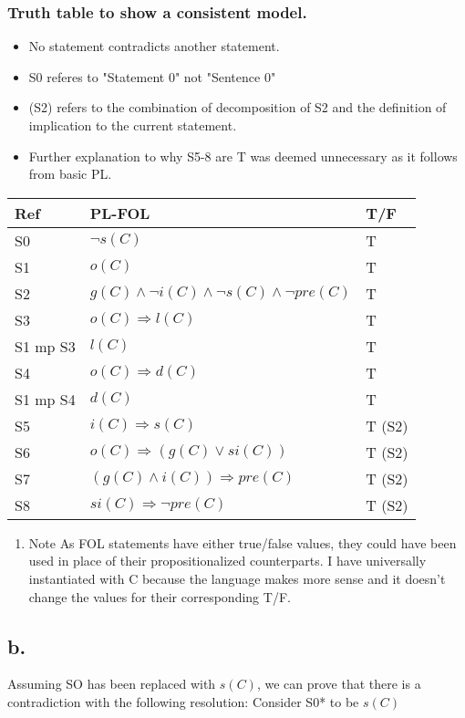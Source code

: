\documentclass[11pt]{article}
\begin{document}
\subsubsection{Truth table to show a consistent model.}
\label{sec:orgddc852a}
\begin{itemize}
\item No statement contradicts another statement.
\item S0 referes to "Statement 0" not "Sentence 0"
\item (S2) refers to the combination of decomposition of S2 and the definition of implication to the current statement.
\item Further explanation to why S5-8 are T was deemed unnecessary as it follows from basic PL.
\end{itemize}
\FloatBarrier
\begin{center}
\begin{tabular}{lll}
Ref & PL-FOL & T/F\\
\hline
S0 & \(\lnot s(C)\) & T\\
S1 & \(o(C)\) & T\\
S2 & \(g(C) \land \lnot i(C) \land \lnot s(C) \land \lnot pre(C)\) & T\\
S3 & \(o(C) \Rightarrow l(C)\) & T\\
S1 mp S3 & \(l(C)\) & T\\
S4 & \(o(C) \Rightarrow d(C)\) & T\\
S1 mp S4 & \(d(C)\) & T\\
S5 & \(i(C) \Rightarrow s(C)\) & T (S2)\\
S6 & \(o(C) \Rightarrow (g(C) \lor si(C))\) & T (S2)\\
S7 & \((g(C) \land i(C)) \Rightarrow pre(C)\) & T (S2)\\
S8 & \(si(C) \Rightarrow \lnot pre(C)\) & T (S2)\\
\end{tabular}
\end{center}
\FloatBarriers
\begin{enumerate}
\item Note
\label{sec:org88e7245}
As FOL statements have either true/false values, they could have been used in place of their propositionalized counterparts. I have universally instantiated with C because the language makes more sense and it doesn't change the values for their corresponding T/F.
\end{enumerate}
\subsection{b.}
\label{sec:org7014713}
Assuming SO has been replaced with \(s(C)\), we can prove that there is a contradiction with the following resolution:
Consider S0* to be \(s(C)\)
\end{document}
